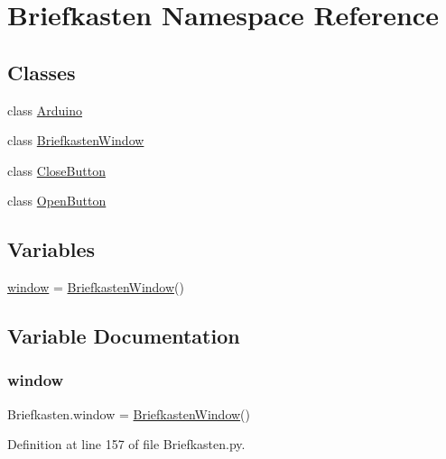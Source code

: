\hypertarget{namespace_briefkasten}{}\section{Briefkasten Namespace Reference}
\label{namespace_briefkasten}
\subsection*{Classes}
\begin{DoxyCompactItemize}
\item 
class \mbox{\hyperlink{class_briefkasten_1_1_arduino}{Arduino}}
\item 
class \mbox{\hyperlink{class_briefkasten_1_1_briefkasten_window}{Briefkasten\+Window}}
\item 
class \mbox{\hyperlink{class_briefkasten_1_1_close_button}{Close\+Button}}
\item 
class \mbox{\hyperlink{class_briefkasten_1_1_open_button}{Open\+Button}}
\end{DoxyCompactItemize}
\subsection*{Variables}
\begin{DoxyCompactItemize}
\item 
\mbox{\hyperlink{namespace_briefkasten_a23e95fd1ba50315d778c20df7e8a0d39}{window}} = \mbox{\hyperlink{class_briefkasten_1_1_briefkasten_window}{Briefkasten\+Window}}()
\end{DoxyCompactItemize}


\subsection{Variable Documentation}
\mbox{\label{namespace_briefkasten_a23e95fd1ba50315d778c20df7e8a0d39}} 
\subsubsection{\texorpdfstring{window}{window}}
{\footnotesize\ttfamily Briefkasten.\+window = \mbox{\hyperlink{class_briefkasten_1_1_briefkasten_window}{Briefkasten\+Window}}()}



Definition at line 157 of file Briefkasten.\+py.

